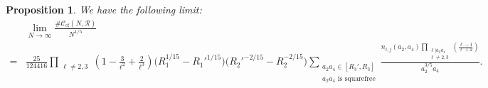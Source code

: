 \documentclass[table]{amsart}
\newtheorem{proposition}[theorem]{Proposition}
\newcommand{\op}[1]{\operatorname{#1}}
\numberwithin{equation}{section}
\begin{document}
\begin{proposition}\label{main propn} We have the following limit:
\[
\begin{split}&\lim_{N\rightarrow\infty}\frac{\#\mathcal{C}_{\op{cf}}(N,\mathscr{R})}{N^{1/5}}\\
=&
\frac{25}{124416}\prod_{\substack{\ell\neq 2,3}}\left(1-\frac{3}{\ell^2}+\frac{2}{\ell^3}\right)
\bigl(R_1^{1/15}-R_1'^{1/15}\bigr)
\bigl(R_2'^{-2/15}-R_2^{-2/15}\bigr) \sum_{\substack{a_2a_4\in [R_3', R_3]\\
    a_2a_4\text{ is squarefree}}}\frac{n_{i,j}(a_2,a_4)\prod_{\substack{\ell|a_2a_4\\ \ell\neq 2,3}}\left(\frac{\ell-1}{\ell+2}\right)}{a_2^{3/5} a_4}.
    \end{split}
\]    
\end{proposition}
\end{document}

